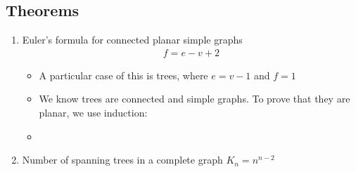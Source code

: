 \documentclass{article}
\begin{document}
\subsection{Theorems}
\begin{enumerate}
	\item Euler's formula for connected planar simple graphs
	\begin{align*}
		f = e - v + 2
	\end{align*}
	\begin{itemize}
		\item A particular case of this is trees, where $e=v-1$ and $f=1$
		\item We know trees are connected and simple graphs. To prove that they are planar, we use induction:
		\item 
	\end{itemize}
	\item Number of spanning trees in a complete graph $K_n=n^{n-2}$
\end{enumerate}
\end{document}
